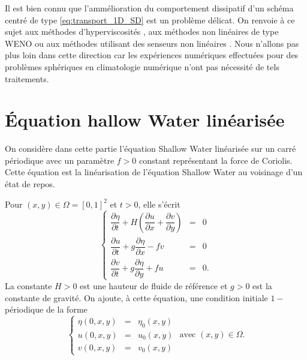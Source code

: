 Il est bien connu que l'ammélioration du comportement dissipatif d'un schéma centré de type \eqref{eq:transport_1D_SD} est un problème délicat. On renvoie à ce sujet aux méthodes d'hyperviscosités \cite{Cook2005}, aux méthodes non linéaires de type WENO \cite{Qiu2002} ou aux méthodes utilisant des senseurs non linéaires \cite{Yee1989}. Nous n'allons pas plus loin dans cette direction car les expériences numériques effectuées pour des problèmes sphériques en climatologie numérique n'ont pas nécessité de tels traitements.














































\section{Équation hallow Water linéarisée}

On considère dans cette partie l'équation Shallow Water linéarisée sur un carré périodique avec un paramètre $f > 0$ constant représentant la force de Coriolis. Cette équation est la linéarisation de l'équation Shallow Water au voisinage d'un état de repos.

Pour $(x,y) \in \Omega = [0,1]^2$ et $t>0$, elle s'écrit 
\begin{equation}
\left\lbrace
\begin{array}{rcl}
\dfrac{\partial \eta}{\partial t} + H \left( \dfrac{\partial u}{\partial x} + \dfrac{\partial v}{\partial y} \right) & = & 0 \\
\dfrac{\partial u}{\partial t} + g \dfrac{\partial \eta}{\partial x} - f v & = & 0 \\
\dfrac{\partial v}{\partial t} + g \dfrac{\partial \eta}{\partial y} + f u & = & 0.
\end{array}
\right.
\label{eq:ondes_2D}
\end{equation}
La constante $H>0$ est une hauteur de fluide de référence et $g>0$ est la constante de gravité.
On ajoute, à cette équation, une condition initiale $1-$périodique de la forme
\begin{equation}
\left\lbrace
\begin{array}{rcl}
\eta(0,x,y) & = & \eta_0(x,y)\\
u(0,x,y) & = & u_0(x,y)\\
v(0,x,y) & = & v_0(x,y)
\end{array}
\right. \text{ avec } (x,y) \in \Omega. 
\end{equation}


